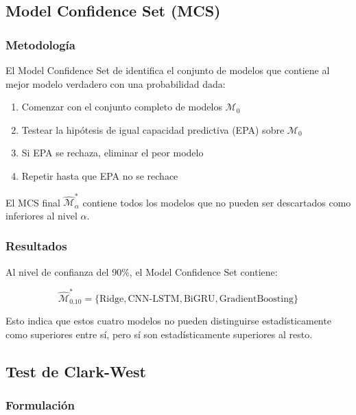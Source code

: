 \subsection{Model Confidence Set (MCS)}
\label{subsec:mcs}

\subsubsection{Metodolog\'ia}

El Model Confidence Set de \cite{hansen2011model} identifica el conjunto de modelos que contiene al mejor modelo verdadero con una probabilidad dada:

\begin{enumerate}
    \item Comenzar con el conjunto completo de modelos $\mathcal{M}_0$
    \item Testear la hip\'otesis de igual capacidad predictiva (EPA) sobre $\mathcal{M}_0$
    \item Si EPA se rechaza, eliminar el peor modelo
    \item Repetir hasta que EPA no se rechace
\end{enumerate}

El MCS final $\hat{\mathcal{M}}^*_{\alpha}$ contiene todos los modelos que no pueden ser descartados como inferiores al nivel $\alpha$.

\subsubsection{Resultados}

Al nivel de confianza del 90\%, el Model Confidence Set contiene:

\begin{equation}
\hat{\mathcal{M}}^*_{0.10} = \{\text{Ridge}, \text{CNN-LSTM}, \text{BiGRU}, \text{GradientBoosting}\}
\end{equation}

Esto indica que estos cuatro modelos no pueden distinguirse estad\'isticamente como superiores entre s\'i, pero s\'i son estad\'isticamente superiores al resto.

\subsection{Test de Clark-West}
\label{subsec:clark_west}

\subsubsection{Formulaci\'on}

